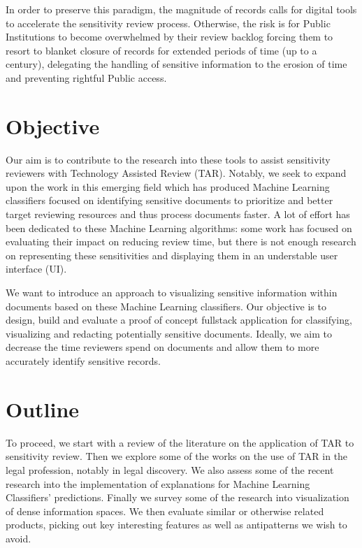\documentclass[\version]{l4proj}
\begin{document}
In order to preserve this paradigm, the magnitude of records calls for digital tools to accelerate the sensitivity review process.
Otherwise, the risk is for Public Institutions to become overwhelmed by their review backlog forcing them to resort to blanket closure of records for extended periods of time (up to a century), delegating the handling of sensitive information to the erosion of time and preventing rightful Public access.

\section{Objective}

Our aim is to contribute to the research into these tools to assist sensitivity reviewers with Technology Assisted Review (TAR).
Notably, we seek to expand upon the work in this emerging field which has produced Machine Learning classifiers focused on identifying sensitive documents to prioritize and better target reviewing resources and thus process documents faster.
A lot of effort has been dedicated to these Machine Learning algorithms: some work has focused on evaluating their impact on reducing review time, but there is not enough research on representing these sensitivities and displaying them in an understable user interface (UI).

We want to introduce an approach to visualizing sensitive information within documents based on these Machine Learning classifiers.
Our objective is to design, build and evaluate a proof of concept fullstack application for classifying, visualizing and redacting potentially sensitive documents.
Ideally, we aim to decrease the time reviewers spend on documents and allow them to more accurately identify sensitive records.

\section{Outline}

To proceed, we start with a review of the literature on the application of TAR to sensitivity review.
Then we explore some of the works on the use of TAR in the legal profession, notably in legal discovery.
We also assess some of the recent research into the implementation of explanations for Machine Learning Classifiers' predictions.
Finally we survey some of the research into visualization of dense information spaces.
We then evaluate similar or otherwise related products, picking out key interesting features as well as antipatterns we wish to avoid.
\end{document}
